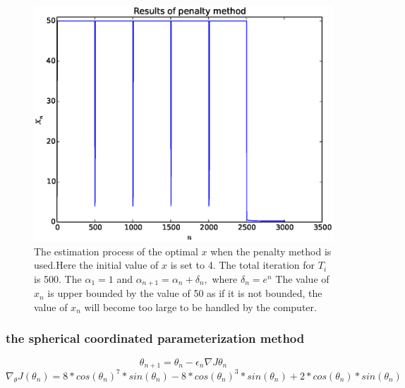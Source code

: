 \documentclass[a4paper,12pt]{article}
\begin{document}
\begin{figure}[H]
\begin{center}
\includegraphics[width=1.0\linewidth]{polynomial_est.eps}


\end{center}
   \caption{The estimation process of the optimal $x$ when the penalty method is used.Here the initial value of $x$ is set to 4. The total iteration for $T_i$ is 500. The $\alpha_1 = 1$ and $\alpha _{n+1} = \alpha _n + \delta_n,$ where $\delta _ n=e^n$ The value of $x_n$ is upper bounded by the value of 50 as if it is not bounded, the value of $x_n$ will become too large to be handled by the computer. }
\label{fig:poly_result}
\end{figure}





\subsubsection{the spherical coordinated parameterization method }

\begin{equation} \label{eq:sphe_poly_a}
\theta_{n+1}=\theta_n-\epsilon _n \nabla J{\theta_ n}
\end{equation}
\begin{equation}\label{eq:sphe_poly_b}
\nabla _{\theta} J(\theta_n) = 8*cos(\theta_n)^7*sin(\theta_n)-8*cos(\theta_n)^3*sin(\theta_n)+2*cos(\theta_n)*sin(\theta_n)
\end{equation}
\end{document}

